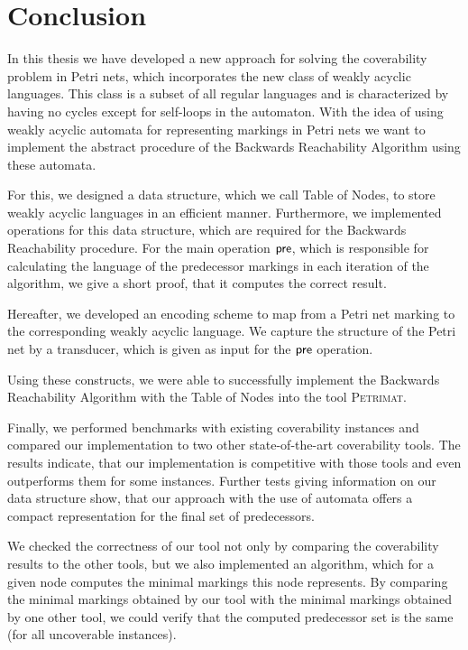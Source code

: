 \chapter{Conclusion}\label{chapter:conclusion}

In this thesis we have developed a new approach for solving the coverability problem in Petri nets, which incorporates the new class of weakly acyclic languages. This class is a subset of all regular languages and is characterized by having no cycles except for self-loops in the automaton.
With the idea of using weakly acyclic automata for representing markings in Petri nets we want to implement the abstract procedure of the Backwards Reachability Algorithm using these automata.
 
For this, we designed a data structure,  which we call Table of Nodes, to store weakly acyclic languages in an efficient manner. Furthermore, we implemented operations for this data structure, which are required for the Backwards Reachability procedure. 
For the main operation $\operatorname{\textsf{pre}}$, which is responsible for calculating the language of the predecessor markings in each iteration of the algorithm, we give a short proof, that it computes the correct result.

Hereafter, we developed an encoding scheme to map from a Petri net marking to the corresponding weakly acyclic language. We capture the structure of the Petri net by a transducer, which is given as input for the $\operatorname{\textsf{pre}}$ operation. 

Using these constructs, we were able to successfully implement the Backwards Reachability Algorithm with the Table of Nodes into the tool \textsc{Petrimat}.

Finally, we performed benchmarks with existing coverability instances and compared our implementation to two other state-of-the-art coverability tools.
The results indicate, that our implementation is competitive with those tools and even outperforms them for some instances. Further tests giving information on our data structure show, that our approach with the use of automata offers a compact representation for the final set of predecessors. 

We checked the correctness of our tool not only by comparing the coverability results to the other tools, but we also implemented an algorithm, which for a given node computes the minimal markings this node represents. By comparing the minimal markings obtained by our tool with the minimal markings obtained by one other tool, we could verify that the computed predecessor set is the same (for all uncoverable instances). 

